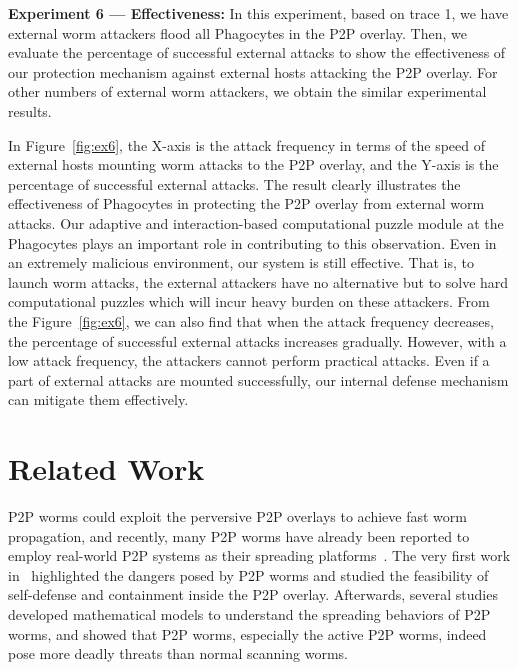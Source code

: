 \documentclass[times,10pt,twocolumn]{article}
\begin{document}
\textbf{Experiment 6 --- Effectiveness:} In this experiment, based
on trace 1, we have  external worm attackers flood all
Phagocytes in the P2P overlay. Then, we evaluate the percentage of
successful external attacks to show the effectiveness of our
protection mechanism against external hosts attacking the P2P
overlay. For other numbers of external worm attackers, we obtain the
similar experimental results.


In Figure~\ref{fig:ex6}, the X-axis is the attack frequency in terms
of the speed of external hosts mounting worm attacks to the P2P
overlay, and the Y-axis is the percentage of successful external
attacks. The result clearly illustrates the effectiveness of
Phagocytes in protecting the P2P overlay from external worm attacks.
Our adaptive and interaction-based computational puzzle module at
the Phagocytes plays an important role in contributing to this
observation. Even in an extremely malicious environment, our system
is still effective. That is, to launch worm attacks, the external
attackers have no alternative but to solve hard computational
puzzles which will incur heavy burden on these attackers. From the
Figure~\ref{fig:ex6}, we can also find that when the attack
frequency decreases, the percentage of successful external attacks
increases gradually. However, with a low attack frequency, the
attackers cannot perform practical attacks. Even if a part of
external attacks are mounted successfully, our internal defense
mechanism can mitigate them effectively.




\section{Related Work}
\label{sec:RelatedWork}

P2P worms could exploit the perversive P2P overlays to achieve fast
worm propagation, and recently, many P2P worms have already been
reported to employ real-world P2P systems as their spreading
platforms~\cite{p2p-worm-website,1639704,shin2006malware}. The very
first work in~\cite{DBLP:conf/iptps/ZhouZMICC05} highlighted the
dangers posed by P2P worms and studied the feasibility of
self-defense and containment inside the P2P overlay. Afterwards,
several studies~\cite{1146876,1639704} developed mathematical models
to understand the spreading behaviors of P2P worms, and showed that
P2P worms, especially the active P2P worms, indeed pose more deadly
threats than normal scanning worms.
\end{document}
